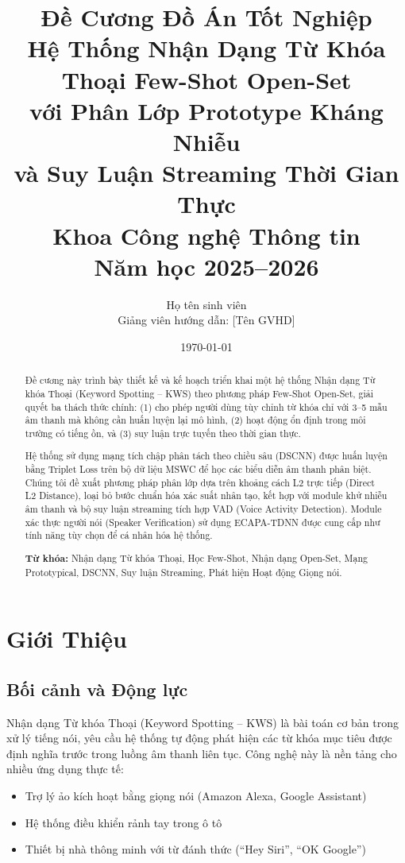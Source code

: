 \documentclass[12pt,a4paper]{report}
\title{
    \vspace{-1cm}
    \textbf{Đề Cương Đồ Án Tốt Nghiệp} \\[0.5cm]
    \Large\textbf{Hệ Thống Nhận Dạng Từ Khóa Thoại Few-Shot Open-Set \\
    với Phân Lớp Prototype Kháng Nhiễu \\
    và Suy Luận Streaming Thời Gian Thực} \\[1cm]
    \large Khoa Công nghệ Thông tin \\
    \large Năm học 2025--2026
}
\author{Họ tên sinh viên \\ Giảng viên hướng dẫn: [Tên GVHD]}
\date{\today}
\begin{document}
\maketitle
\thispagestyle{empty}

\begin{abstract}
Đề cương này trình bày thiết kế và kế hoạch triển khai một hệ thống Nhận dạng
Từ khóa Thoại (Keyword Spotting -- KWS) theo phương pháp Few-Shot Open-Set, giải
quyết ba thách thức chính: (1) cho phép người dùng tùy chỉnh từ khóa chỉ với
3--5 mẫu âm thanh mà không cần huấn luyện lại mô hình, (2) hoạt động ổn định
trong môi trường có tiếng ồn, và (3) suy luận trực tuyến theo thời gian thực.

Hệ thống sử dụng mạng tích chập phân tách theo chiều sâu (DSCNN) được huấn luyện
bằng Triplet Loss trên bộ dữ liệu MSWC để học các biểu diễn âm thanh phân biệt.
Chúng tôi đề xuất phương pháp phân lớp dựa trên khoảng cách L2 trực tiếp (Direct
L2 Distance), loại bỏ bước chuẩn hóa xác suất nhân tạo, kết hợp với module khử
nhiễu âm thanh và bộ suy luận streaming tích hợp VAD (Voice Activity Detection).
Module xác thực người nói (Speaker Verification) sử dụng ECAPA-TDNN được cung cấp
như tính năng tùy chọn để cá nhân hóa hệ thống.

\textbf{Từ khóa:} Nhận dạng Từ khóa Thoại, Học Few-Shot, Nhận dạng Open-Set,
Mạng Prototypical, DSCNN, Suy luận Streaming, Phát hiện Hoạt động Giọng nói.
\end{abstract}

\tableofcontents
\newpage

\chapter{Giới Thiệu}

\section{Bối cảnh và Động lực}

Nhận dạng Từ khóa Thoại (Keyword Spotting -- KWS) là bài toán cơ bản trong xử lý
tiếng nói, yêu cầu hệ thống tự động phát hiện các từ khóa mục tiêu được định nghĩa
trước trong luồng âm thanh liên tục. Công nghệ này là nền tảng cho nhiều ứng dụng
thực tế:

\begin{itemize}
    \item Trợ lý ảo kích hoạt bằng giọng nói (Amazon Alexa, Google Assistant)
    \item Hệ thống điều khiển rảnh tay trong ô tô
    \item Thiết bị nhà thông minh với từ đánh thức (``Hey Siri'', ``OK Google'')
\end{itemize}
\end{document}

